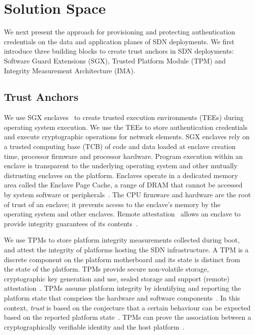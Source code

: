 {%
\section{Solution Space}
\label{sec:arch}
We next present the approach for provisioning and protecting authentication credentials on the data and application planes of SDN deployments.
We first introduce three building blocks to create trust anchors in SDN deployments: 
Software Guard Extensions (SGX), Trusted Platform Module (TPM) and Integrity Measurement Architecture (IMA).

\subsection{Trust Anchors}
\label{subsec:trust-anchors}
We use SGX enclaves~\cite{anati:2013,mckeen:2013,xing:2016,mckeen:2016} to create trusted execution environments (TEEs) during operating system execution.
We use the TEEs to store authentication credentials and execute cryptographic operations for network elements.
SGX enclaves rely on a trusted computing base (TCB) of code and data loaded at enclave creation time, processor firmware and processor hardware.
Program execution within an enclave is transparent to the underlying operating system and other mutually distrusting enclaves on the platform.
Enclaves operate in a dedicated memory area called the Enclave Page Cache, a range of DRAM that cannot be accessed by system software or peripherals~\cite{mckeen:2013,intel64}.
The CPU firmware and hardware are the root of trust of an enclave;
it prevents access to the enclave's memory by the operating system and other enclaves.
Remote attestation~\cite{coker:2011} allows an enclave to provide integrity guarantees of its contents~\cite{anati:2013}.

We use TPMs to store platform integrity measurements collected during boot, and attest the integrity of platforms hosting the SDN infrastructure.
A TPM is a discrete component on the platform motherboard and its state is distinct from the state of the platform.
TPMs provide secure non-volatile storage, cryptographic key generation and use, sealed storage and support (remote) attestation~\cite{TPM1.2spec}.
TPMs assume platform integrity by identifying and reporting the platform state that comprises the hardware and software components~\cite{nyman:2014}.
In this context, \textit{trust} is based on the conjecture that a certain behaviour can be expected based on the reported platform state~\cite{paladi:2017c}.
TPMs can prove the association between a cryptographically verifiable identity and the host platform~\cite{TPM1.2spec,TPM2.0r16}.


}
